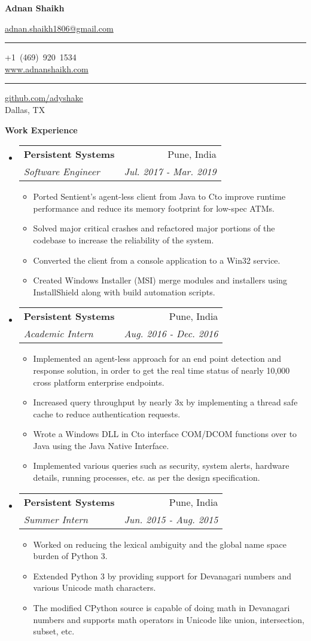 \documentclass[letterpaper,12pt]{article}
\makeatletter
\def\CC{{C\nolinebreak[4]\hspace{-.05em}\raisebox{.4ex}{\tiny\bf ++ }}}
\newcommand{\resitem}[1]{\item #1 \vspace{-2pt}}
\newcommand{\resheading}[1]{{\large \colorbox{mygrey}{\begin{minipage}{\textwidth}{\textbf{#1 \vphantom{p\^{E}}}}\end{minipage}}}}
\newcommand{\ressubheading}[4]{
    \begin{tabular*}{7.0in}{l@{\extracolsep{\fill}}r}
      \textbf{#1} & #2 \\
      \textit{#3} & \textit{#4} \\
    \end{tabular*}\vspace{-6pt}}
\makeatother
\begin{document}
  
  \begin{center}
    \textbf{\Large Adnan Shaikh}\\
    
    \vspace{0.05in}
    
    \href{mailto:adnan.shaikh1806@gmail.com}{adnan.shaikh1806@gmail.com} \rule[-0.4ex]{0.08ex}{1.0em} +1~(469)~920~1534\\
    \href{https://www.adnanshaikh.com}{www.adnanshaikh.com} \rule[-0.4ex]{0.08ex}{1.0em} \href{https://github.com/adyshake}{github.com/adyshake}\\
    Dallas, TX \\
  \end{center}
  
  \resheading{Work Experience}
  \begin{itemize}
  \item
    \ressubheading{Persistent Systems}{Pune, India}{Software Engineer}{Jul. 2017 - Mar. 2019}
    \begin{itemize}
      \resitem{Ported Sentient's agent-less client from Java to \CC to improve runtime performance and reduce its memory footprint for low-spec ATMs.}
      \resitem{Solved major critical crashes and refactored major portions of the codebase to increase the reliability of the system.}
      \resitem{Converted the client from a console application to a Win32 service.}
      \resitem{Created Windows Installer (MSI) merge modules and installers using InstallShield along with build automation scripts.}
    \end{itemize}
  \item
    \ressubheading{Persistent Systems}{Pune, India}{Academic Intern}{Aug. 2016 - Dec. 2016}
    \begin{itemize}
      \resitem{Implemented an agent-less approach for an end point detection and response solution, in order to get the real time status of nearly 10,000 cross platform enterprise endpoints.}
      \resitem{Increased query throughput by nearly 3x by implementing a thread safe cache to reduce authentication requests.}
      \resitem{Wrote a Windows DLL in \CC to interface COM/DCOM functions over to Java using the Java Native Interface.}
      \resitem{Implemented various queries such as security, system alerts, hardware details, running processes, etc. as per the design specification.}
    \end{itemize}
  \item
    \ressubheading{Persistent Systems}{Pune, India}{Summer Intern}{Jun. 2015 - Aug. 2015}
    \begin{itemize}
      \resitem{Worked on reducing the lexical ambiguity and the global name space burden of Python 3.}
      \resitem{Extended Python 3 by providing support for Devanagari numbers and various Unicode math characters.}
      \resitem{The modified CPython source is capable of doing math in Devanagari numbers and supports math operators in Unicode like union, intersection, subset, etc.}
    \end{itemize}
  \end{itemize}
  
\end{document}
